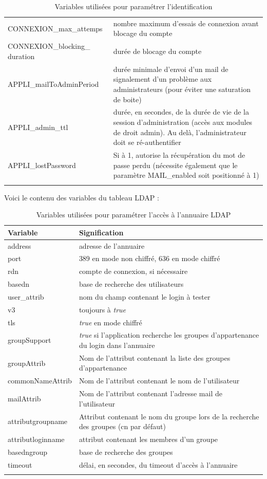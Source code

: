 \begin{longtable}{|p{5cm}|p{8cm}|}
CONNEXION\_max\_attemps & nombre maximum d'essais de connexion avant blocage du compte \\

CONNEXION\_blocking\_ duration & durée de blocage du compte \\

APPLI\_mailToAdminPeriod & durée minimale d'envoi d'un mail de signalement d'un problème aux administrateurs (pour éviter une saturation de boite) \\

APPLI\_admin\_ttl & durée, en secondes, de la durée de vie de la session d'administration (accès aux modules de droit admin). Au delà, l'administrateur doit se ré-authentifier \\

APPLI\_lostPassword & Si à 1, autorise la récupération du mot de passe perdu (nécessite également que le paramètre MAIL\_enabled soit positionné à 1) \\
\hline

\caption{Variables utilisées pour paramétrer l'identification}
\end{longtable}

Voici le contenu des variables du tableau LDAP : 
\begin{longtable}{|p{5cm}|p{8cm}|}
\hline
\textbf{Variable} & \textbf{Signification} \\
\hline
\endhead
address &  adresse de l'annuaire\\
port & 389 en mode non chiffré, 636 en mode chiffré\\
rdn & compte de connexion, si nécessaire \\
basedn & base de recherche des utilisateurs\\
user\_attrib & nom du champ contenant le login à tester\\
v3 & toujours à \textit{true}\\
tls & \textit{true} en mode chiffré\\
groupSupport & \textit{true} si l'application recherche les groupes d'appartenance du login dans l'annuaire\\
groupAttrib & Nom de l'attribut contenant la liste des groupes d'appartenance\\
commonNameAttrib & Nom de l'attribut contenant le nom de l'utilisateur\\
mailAttrib & Nom de l'attribut contenant l'adresse mail de l'utilisateur\\
attributgroupname & Attribut contenant le nom du groupe lors de la recherche des groupes (cn par défaut)\\
attributloginname & attribut contenant les membres d'un groupe\\
basedngroup & base de recherche des groupes \\
timeout & délai, en secondes, du timeout d'accès à l'annuaire \\
\hline
\caption{Variables utilisées pour paramétrer l'accès à l'annuaire LDAP}
\end{longtable}

